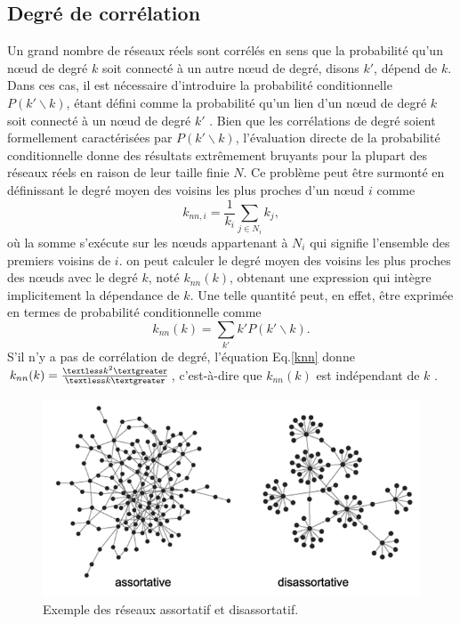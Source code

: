 \subsection{Degré de corrélation} 
Un grand nombre de réseaux réels sont corrélés en sens que la probabilité qu'un nœud de degré $k$ soit connecté à un autre
nœud de degré, disons $k'$, dépend de $k$. Dans ces cas, il est nécessaire d'introduire la probabilité conditionnelle 
$P(k'\backslash k)$, étant défini comme la probabilité qu'un lien d'un nœud de degré $k$ soit connecté à un nœud de degré 
$k'$ \cite{BP2002}. Bien que les corrélations de degré soient formellement caractérisées par $P(k'\backslash k)$, l'évaluation
directe de la probabilité conditionnelle donne des résultats extrêmement bruyants pour la plupart des réseaux réels en raison
de leur taille finie $N$. Ce problème peut être surmonté en définissant le degré moyen des voisins les plus proches d'un nœud $i$
comme
\begin{equation}
 k_{nn,i}=\frac{1}{k_i}\sum_{j\in N_i}k_j,
\end{equation}
où la somme s'exécute sur les nœuds appartenant à $N_i$ qui signifie l'ensemble des premiers voisins de $i$. on peut calculer le degré 
moyen des voisins les plus proches des nœuds avec le degré $k$, noté $k_{nn}(k)$, obtenant une expression qui intègre implicitement
la dépendance de $k$. Une telle quantité peut, en effet, être exprimée en termes de probabilité conditionnelle comme
\begin{equation}
 k_{nn}(k)=\sum_{k'}k'P(k'\backslash k).
 \label{knn}
\end{equation}
S'il n'y a pas de corrélation de degré, l'équation Eq.\ref{knn} donne
$k_{nn}(k)=\frac{\textless k^2\textgreater}{\textless k\textgreater}$, c'est-à-dire que $k_{nn}(k)$ est indépendant de $k$
\cite{Bo-al2006}.\\
\begin{figure}[h!]
	\centering
	\includegraphics[scale=0.6]{./figures/assortative_disassortative}
	\caption{Exemple des réseaux assortatif et disassortatif.}
	\label{assortative_disassortative}
\end{figure}
\label{s-correl}

